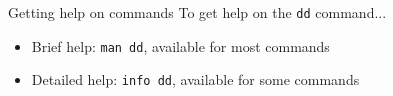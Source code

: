 \begin{block}{Getting help on commands}
  To get help on the \texttt{dd} command...
  \begin{itemize}
  \item Brief help: \texttt{man dd}, available for most commands
  \item Detailed help: \texttt{info dd}, available for some commands
  \end{itemize}
\end{block}
